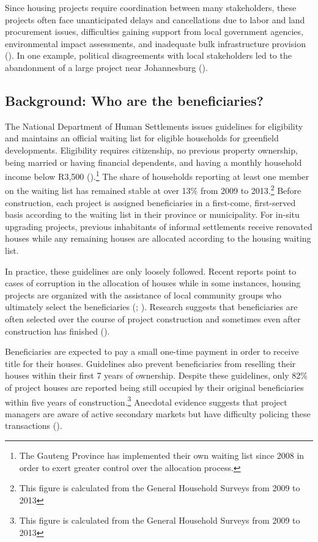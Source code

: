 \documentclass[12pt]{article}
\begin{document}
Since housing projects require coordination between many stakeholders, these projects often face unanticipated delays and cancellations due to labor and land procurement issues, difficulties gaining support from local government agencies, environmental impact assessments, and inadequate bulk infrastructure provision (\cite{dhsreports}).  In one example, political disagreements with local stakeholders led to the abandonment of a large project near Johannesburg (\cite{protest}).

\subsection{Background: Who are the beneficiaries?}

The National Department of Human Settlements issues guidelines for eligibility and maintains an official waiting list for eligible households for greenfield developments.  Eligibility requires citizenship, no previous property ownership, being married or having financial dependents, and having a monthly household income below R3,500 (\cite{seriq}).\footnote{The Gauteng Province has implemented their own waiting list since 2008 in order to exert greater control over the allocation process.}  The share of households reporting at least one member on the waiting list has remained stable at over 13\% from 2009 to 2013.\footnote{This figure is calculated from the General Household Surveys from 2009 to 2013}  Before construction, each project is assigned beneficiaries in a first-come, first-served basis according to the waiting list in their province or municipality.  For in-situ upgrading projects, previous inhabitants of informal settlements receive renovated houses while any remaining houses are allocated according to the housing waiting list.

In practice, these guidelines are only loosely followed.  Recent reports point to cases of corruption in the allocation of houses while in some instances, housing projects are organized with the assistance of local community groups who ultimately select the beneficiaries (\cite{seriq}; \cite{casestudytinazonke}).  Research suggests that beneficiaries are often selected over the course of project construction and sometimes even after construction has finished (\cite{seriq}).

Beneficiaries are expected to pay a small one-time payment in order to receive title for their houses.  Guidelines also prevent beneficiaries from reselling their houses within their first 7 years of ownership.  Despite these guidelines, only 82\% of project houses are reported being still occupied by their original beneficiaries within five years of construction.\footnote{This figure is calculated from the General Household Surveys from 2009 to 2013}  Anecdotal evidence suggests that project managers are aware of active secondary markets but have difficulty policing these transactions (\cite{resale}).
\end{document}
